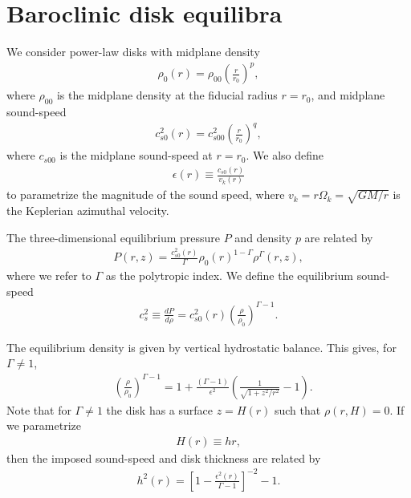  \section{Baroclinic disk equilibra}
 We consider power-law disks with midplane density
 \begin{align}
   \rho_0(r) = \rho_{00}\left(\frac{r}{r_0}\right)^p,
 \end{align}
 where $\rho_{00}$ is the midplane density at the fiducial radius
 $r=r_0$, and midplane sound-speed 
 \begin{align}
   c_{s0}^2(r)=c_{s00}^2\left(\frac{r}{r_0}\right)^q, 
 \end{align}
 where $c_{s00}$ is the midplane sound-speed at $r=r_0$. We also
 define
\begin{align}
  \epsilon(r) \equiv \frac{c_{s0}(r)}{v_k(r)}
\end{align}
to parametrize the magnitude of the sound speed, where
$v_k=r\Omega_k=\sqrt{GM/r}$ is the Keplerian azimuthal velocity. 

The three-dimensional equilibrium pressure $P$ and density $p$ are
related by 
\begin{align}
  P(r,z) = 
  \frac{c_{s0}^2(r)}{\Gamma}\rho_0(r)^{1-\Gamma}\rho^\Gamma(r,z), 
\end{align}
where we refer to $\Gamma$ as the polytropic index. We define the
equilibrium sound-speed
\begin{align}
  c_s^2\equiv \frac{dP}{d\rho} =
  c_{s0}^2(r)\left(\frac{\rho}{\rho_0}\right)^{\Gamma-1}.  
\end{align}

The equilibrium density is given by vertical hydrostatic balance. This
gives, for $\Gamma\neq1$,  
\begin{align}\label{eqm_dens}
  &\left(\frac{\rho}{\rho_0}\right)^{\Gamma-1} = 1 +
  \frac{\left(\Gamma-1\right)}{\epsilon^2}\left(\frac{1}{\sqrt{1+z^2/r^2}}-1\right). 
\end{align}
Note that for $\Gamma\neq1$ the disk has a surface $z=H(r)$ such that
$\rho(r,H)=0$. If we parametrize
\begin{align}
  H(r)\equiv h r,
\end{align}
then the imposed sound-speed and disk thickness are related by 
\begin{align}
  h^2(r) = \left[1-\frac{\epsilon^2(r)}{\Gamma-1}\right]^{-2}-1. 
\end{align}

